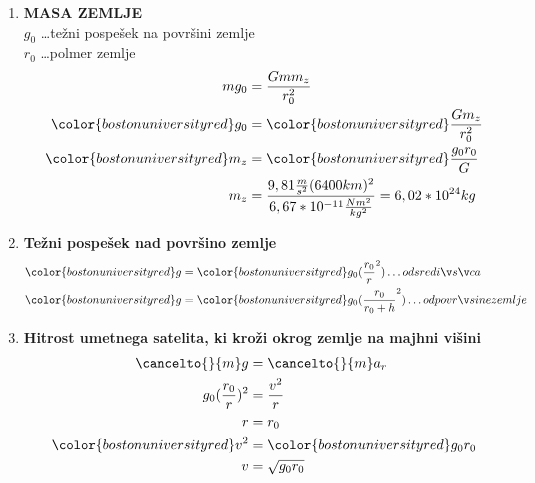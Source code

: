 \begin{enumerate}
	\item \textbf{MASA ZEMLJE}\\
		$g_0$ \dots težni pospešek na površini zemlje\\
		$r_0$ \dots polmer zemlje\\
		\begin{align*}
			mg_0 &= \frac{Gmm_z}{r_0^2}\\
			{\color{bostonuniversityred}g_0} &= {\color{bostonuniversityred}\frac{Gm_z}{r_0^2}}\\
			{\color{bostonuniversityred}m_z} &= {\color{bostonuniversityred}\frac{g_0r_0}{G}}\\
			m_z &= \frac{9,81\frac{m}{s^2}(6400km)^2}{6,67*10^{-11}\frac{Nm^2}{kg^2}} = 6,02*10^{24} kg\\
		\end{align*}
	\item \textbf{Težni pospešek nad površino zemlje}\\
		\begin{align*}
			{\color{bostonuniversityred}g} &= {\color{bostonuniversityred}g_0(\frac{r_0}{r}^2)} \dots od središča\\
			{\color{bostonuniversityred}g} &= {\color{bostonuniversityred}g_0(\frac{r_0}{r_0+h}^2)} \dots od površine zemlje\\
		\end{align*}
	\item \textbf{Hitrost umetnega satelita, ki kroži okrog zemlje na majhni višini}\\
		\begin{align*}
			{\cancelto{}{m}}g &= {\cancelto{}{m}}a_r\\
			g_0(\frac{r_0}{r})^2 &= \frac{v^2}{r}\\
			r &= r_0\\
			{\color{bostonuniversityred}v^2} &= {\color{bostonuniversityred}g_0r_0}\\
			v &= \sqrt{g_0r_0}\\

\end{align*}
\end{enumerate}
